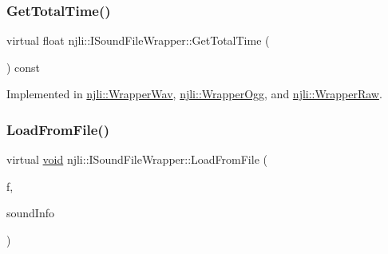 \mbox{\label{classnjli_1_1_i_sound_file_wrapper_a1b22318560969f7cc06ac03dcb78971f}} 
\subsubsection{\texorpdfstring{Get\+Total\+Time()}{GetTotalTime()}}
{\footnotesize\ttfamily virtual float njli\+::\+I\+Sound\+File\+Wrapper\+::\+Get\+Total\+Time (\begin{DoxyParamCaption}{ }\end{DoxyParamCaption}) const\hspace{0.3cm}{\ttfamily [pure virtual]}}



Implemented in \mbox{\hyperlink{classnjli_1_1_wrapper_wav_ae281e2ac23707e6eb2c1f2e7fcb58881}{njli\+::\+Wrapper\+Wav}}, \mbox{\hyperlink{classnjli_1_1_wrapper_ogg_adb921d96c9d60b6539fbc05e08989ffa}{njli\+::\+Wrapper\+Ogg}}, and \mbox{\hyperlink{classnjli_1_1_wrapper_raw_a2aa8be2aa5e292b3375c1a92f007592c}{njli\+::\+Wrapper\+Raw}}.

\mbox{\label{classnjli_1_1_i_sound_file_wrapper_a525f86e4bbe65d5b90ee3eda171b5492}} 
\subsubsection{\texorpdfstring{Load\+From\+File()}{LoadFromFile()}}
{\footnotesize\ttfamily virtual \mbox{\hyperlink{_thread_8h_af1e856da2e658414cb2456cb6f7ebc66}{void}} njli\+::\+I\+Sound\+File\+Wrapper\+::\+Load\+From\+File (\begin{DoxyParamCaption}\item[{F\+I\+LE $\ast$}]{f,  }\item[{Sound\+Info $\ast$}]{sound\+Info }\end{DoxyParamCaption})\hspace{0.3cm}{\ttfamily [pure virtual]}}



